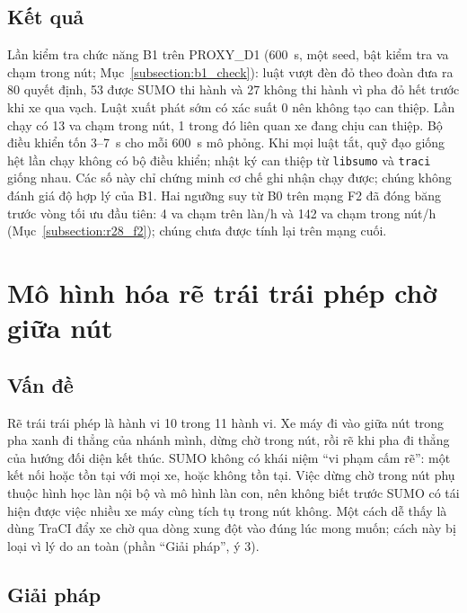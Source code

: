 \documentclass[../DoAn.tex]{subfiles}
\begin{document}
\subsection{Kết quả}

Lần kiểm tra chức năng B1 trên PROXY\_D1 (600~s, một seed, bật kiểm tra va chạm trong nút; Mục~\ref{subsection:b1_check}): luật vượt đèn đỏ theo đoàn đưa ra 80 quyết định, 53 được SUMO thi hành và 27 không thi hành vì pha đỏ hết trước khi xe qua vạch. Luật xuất phát sớm có xác suất 0 nên không tạo can thiệp. Lần chạy có 13 va chạm trong nút, 1 trong đó liên quan xe đang chịu can thiệp. Bộ điều khiển tốn 3--7~s cho mỗi 600~s mô phỏng. Khi mọi luật tắt, quỹ đạo giống hệt lần chạy không có bộ điều khiển; nhật ký can thiệp từ \texttt{libsumo} và \texttt{traci} giống nhau. Các số này chỉ chứng minh cơ chế ghi nhận chạy được; chúng không đánh giá độ hợp lý của B1. Hai ngưỡng suy từ B0 trên mạng F2 đã đóng băng trước vòng tối ưu đầu tiên: 4 va chạm trên làn/h và 142 va chạm trong nút/h (Mục~\ref{subsection:r28_f2}); chúng chưa được tính lại trên mạng cuối.

\section{Mô hình hóa rẽ trái trái phép chờ giữa nút}
\label{section:5.3}

\subsection{Vấn đề}

Rẽ trái trái phép là hành vi 10 trong 11 hành vi. Xe máy đi vào giữa nút trong pha xanh đi thẳng của nhánh mình, dừng chờ trong nút, rồi rẽ khi pha đi thẳng của hướng đối diện kết thúc. SUMO không có khái niệm ``vi phạm cấm rẽ'': một kết nối hoặc tồn tại với mọi xe, hoặc không tồn tại. Việc dừng chờ trong nút phụ thuộc hình học làn nội bộ và mô hình làn con, nên không biết trước SUMO có tái hiện được việc nhiều xe máy cùng tích tụ trong nút không. Một cách dễ thấy là dùng TraCI đẩy xe chờ qua dòng xung đột vào đúng lúc mong muốn; cách này bị loại vì lý do an toàn (phần ``Giải pháp'', ý 3).

\subsection{Giải pháp}
\end{document}
